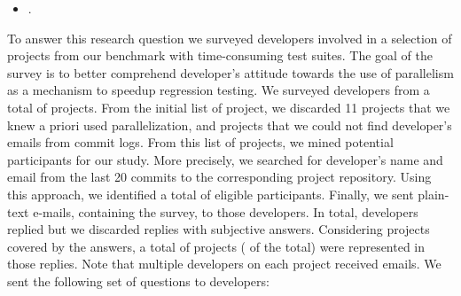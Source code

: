 \begin{itemize}
  \item \numRQAdoptionTwo{}. \textbf{\RQAdoptionTwo{}}
\end{itemize}

To answer this research question we surveyed developers involved in a
selection of projects from our benchmark with time-consuming test
suites.  The goal of the survey is to better comprehend developer's
attitude towards the use of parallelism as a mechanism to speedup
regression testing.  We surveyed developers from a total of
\emailsProjects{} projects.  From the initial list of \numMedLong{}
project, we discarded 11 projects that we knew a priori used
parallelization, and \discartedProjects{} projects that we could not find
developer's emails from commit logs.  From this list of projects, we
mined potential participants for our study.  More precisely, we
searched for developer's name and email from the last 20 commits to
the corresponding project repository.  Using this approach, we
identified a total of \emailsSent{} eligible participants.  Finally,
we sent plain-text e-mails, containing the survey, to those developers.  In
total, \emailsAnswered{} developers replied but we discarded
\emailsFalseAnswers{} replies with subjective answers.  Considering
projects covered by the answers, a total of \emailsProjectsAnswered{}
projects (\percEmailsProjectsAnswered{} of the total) were represented
in those replies. 
Note that multiple developers on each project
received emails.  We sent the following set of questions to
developers:


